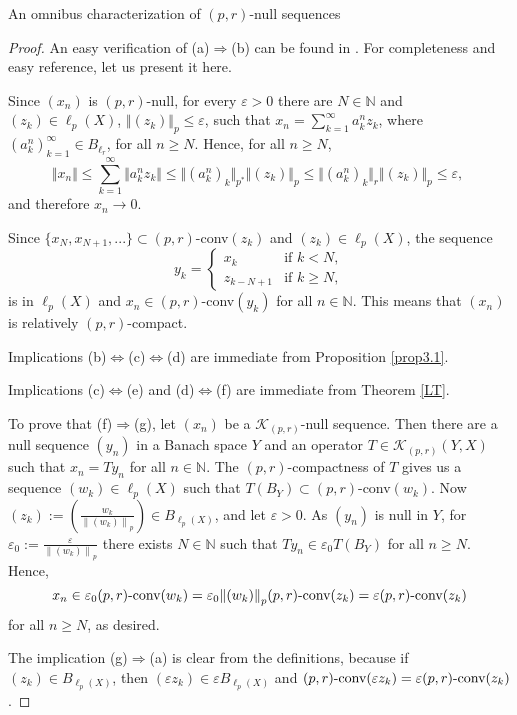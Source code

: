 \documentclass[a4paper,11pt]{amsart}
\theoremstyle{definition}
\theoremstyle{definition}
\theoremstyle{definition}
\begin{document}
\begin{section}{An omnibus characterization of $(p,r)$-null sequences}
\begin{proof}
An easy verification of (a)$\Rightarrow $(b) can be found in \cite[Proposition~2]{AO1}. For completeness and easy reference, let us present it here. 

Since  $(x_n)$ is $(p,r)$-null, for every ${\varepsilon} >0$ there are $N \in {{\mathbb N}}$ and $(z_k)\in \ell_p(X)$, $\Vert (z_k) \Vert _p \leq {\varepsilon}$, such that $x_n =\sum _{k=1}^\infty a_k^n z_k $, where $(a_k ^n)_{k=1}^\infty \in B_{\ell _r}$, for all $n \geq N$. Hence, for all $n\geq N$,
\[
\Vert x_n  \Vert\leq \sum _{k=1}^\infty \Vert a_k^n z_k\Vert \leq \Vert (a_k^n)_k \Vert _{p^{\ast}} \Vert (z_k)\Vert _p \leq \Vert (a_k^n)_k\Vert _r \Vert (z_k)\Vert _p \leq {\varepsilon}, \; 
\]  
and therefore $x_n{\rightarrow} 0$.

Since $\{x_N, x_{N+1}, ...\}\subset(p,r)$-conv$(z_k)$ and $(z_k)\in \ell_p(X)$, 
the sequence
\[
y_k=\begin{cases}
x_k& \text{if } k< N, \\
z_{k-N+1}  & \text{if } k \geq N,
\end{cases}
\]
is in $\ell_p(X)$ and $x_n \in (p,r)$-conv$(y_k)$ for all $n \in {{\mathbb N}}$. This means that $(x_n)$ is relatively ${{(p,r)}}$-compact.

Implications (b)$ \Leftrightarrow $(c)$\Leftrightarrow$(d) are immediate from Proposition \ref{prop3.1}.

Implications (c)$\Leftrightarrow$(e) and (d)$\Leftrightarrow$(f) are immediate from Theorem \ref{LT}.

To prove that (f)$\Rightarrow$(g), let $(x_n)$ be a ${{\mathcal K}}_{(p,r)}$-null sequence. Then there are a null sequence $(y_n)$ in a Banach space $Y$ and an operator $T \in {{\mathcal K}}_{{(p,r)}} (Y,X)$ such that $x_n= Ty_n$ for all $n\in {{\mathbb N}}$. The ${{(p,r)}}$-compactness of $T$ gives us a sequence $(w_k) \in \ell_p(X)$ such that $T(B_Y)\subset {{(p,r)}}$-conv$(w_k)$.
Now $(z_k):=\left (\frac{w_k}{{\left\lVert {(w_k)} \right\rVert}_p }\right )\in B_{\ell_p(X)}$, and let ${\varepsilon}>0$. As $(y_n)$ is null in $Y$, for ${\varepsilon}_0:=\frac{\varepsilon}{{\left\lVert {(w_k)} \right\rVert}_p}$ there exists $N\in {{\mathbb N}}$ such that $Ty_n \in {\varepsilon}_0 T(B_Y)$ for all $n\geq N$. Hence,
\[
x_n\in {\varepsilon}_0{{(p,r)}}\textnormal{-conv}(w_k) ={\varepsilon}_0 {\left\lVert {(w_k)} \right\rVert}_p {{(p,r)}} \textnormal{-conv}(z_k)= {\varepsilon} {{(p,r)}}\textnormal{-conv}(z_k)
\]
for all $n \geq N$, as desired.

The implication (g)$\Rightarrow$(a) is clear from the definitions, because if $(z_k)\in B_{\ell_p(X)}$, then $({\varepsilon} z_k)\in {\varepsilon} B_{\ell_p(X)}$ and ${{(p,r)}} \textnormal{-conv}({\varepsilon} z_k)= {\varepsilon} {{(p,r)}}\textnormal{-conv}(z_k)$.
\end{proof}


\end{section}
\end{document}
